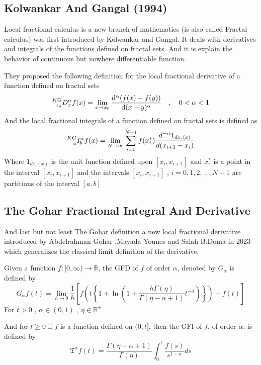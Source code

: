 \subsection{Kolwankar And Gangal (1994)}
Local fractional calculus is a new branch of mathematics (is also called Fractal calculus) 
was first introduced by Kolwankar and Gangal. It deals with derivatives and integrals of the functions defined on fractal sets. 
And it is explain the behavior of continuous but nowhere differentiable function.

They proposed the following definition for the local fractional derivative of a function defined on fractal sets
\[
    \prescript{KG}{x_0}{D_x^{\alpha}} f(x) = \lim_{x \to x_0}  \dv[\alpha]{(f(x)-f(y))}{(x-y)} \quad,\quad 0<\alpha<1
\]
And the local fractional integrals of a function defined on fractal sets is defined as   
\[
    \prescript{KG}{a}{I_b^{\alpha}} f(x) = \lim_{N \to \infty} \sum_{i=0}^{N-1} f(x_i^*) \frac{d^{-\alpha} 1_{dx_i(x)}}{d(x_{i+1}-x_i)}
\]
Where $1_{dx_i(x)}$ is the unit function defined upon $[x_{i},x_{i+1}]$ and $x_i^*$ is a point in the interval $[x_{i},x_{i+1}]$
and the intervals $[x_{i},x_{i+1}]$ , $i=0,1,2,\dots,N-1$ are partitions of the interval $[a,b]$

\subsection{The Gohar Fractional Integral And Derivative}
And last but not least The Gohar definition a new local fractional derivative
introduced by Abdelrahman Gohar ,Mayada Younes and Salah B.Doma in 2023
which generalizes the classical limit definition of the derivative.

Given a function $f : [0,\infty) \to \mathbb{R}$, the GFD of $f$ of order $\alpha$, denoted by $G_\alpha$ is defined by
\[
    G_\alpha f(t) = \lim_{h \to 0} \frac{1}{h}\left[  f\left( t \left\{ 1+ \ln\left( 1+ \frac{h\Gamma(\eta)}{\Gamma(\eta-\alpha+1)} t^{-\alpha} \right)\right\}\right) -f(t) \right]
\]
For $t>0$ , $\alpha \in (0,1)$ , $\eta \in \mathbb{R}^+$

And for $t \geq 0$ if $f$ is a function defined on $(0, t]$, then the GFI of $f$, of order $\alpha$,
is defined by
\[
    \mathfrak{T}^\alpha f(t) = \frac{\Gamma(\eta-\alpha+1)}{\Gamma(\eta)} \int_{0}^{t} \frac{f(s)}{s^{1-\alpha}} ds
\]

